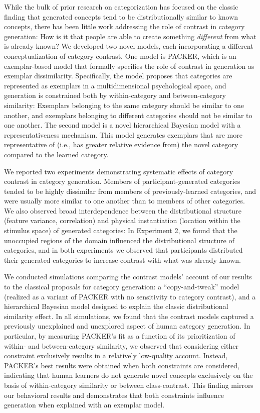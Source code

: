 \documentclass[12pt]{article}
\begin{document}
\begin{flushleft}
While the bulk of prior research on categorization has focused on the classic
finding that generated concepts tend to be distributionally similar to known
concepts, there has been little work addressing the role of contrast in category
generation: How is it that people are able to create something {\em different}
from what is already known? We developed two novel models, each incorporating a
different conceptualization of category contrast. One model is PACKER, which is
an exemplar-based model that formally specifies the role of contrast in
generation as exemplar dissimilarity. Specifically, the model proposes that
categories are represented as exemplars in a multidimensional psychological
space, and generation is constrained both by within-category and
between-category similarity: Exemplars belonging to the same category should be
similar to one another, and exemplars belonging to different categories should
not be similar to one another. The second model is a novel hierarchical Bayesian
model with a representativeness mechanism. This model generates exemplars that
are more representative of (i.e., has greater relative evidence from) the novel
category compared to the learned category.

We reported two experiments demonstrating systematic effects of category
contrast in category generation. Members of participant-generated categories
tended to be highly dissimilar from members of previously-learned categories,
and were usually more similar to one another than to members of other
categories. We also observed broad interdependence between the distributional
structure (feature variance, correlation) and physical instantiation (location
within the stimulus space) of generated categories: In Experiment 2, we found
that the unoccupied regions of the domain influenced the distributional
structure of categories, and in both experiments we observed that participants
distributed their generated categories to increase contrast with what was
already known.

We conducted simulations comparing the contrast models' account of our results
to the classical proposals for category generation: a ``copy-and-tweak'' model
(realized as a variant of PACKER with no sensitivity to category contrast), and
a hierarchical Bayesian model designed to explain the classic distributional
similarity effect. In all simulations, we found that the contrast models
captured a previously unexplained and unexplored aspect of human category
generation. In particular, by measuring PACKER's fit as a function of its
prioritization of within- and between-category similarity, we observed that
considering either constraint exclusively results in a relatively low-quality
account. Instead, PACKER's best results were obtained when both constraints are
considered, indicating that human learners do not generate novel concepts
exclusively on the basis of within-category similarity or between
class-contrast. This finding mirrors our behavioral results and demonstrates
that both constraints influence generation when explained with an exemplar
model. 


\end{flushleft}
\end{document}
